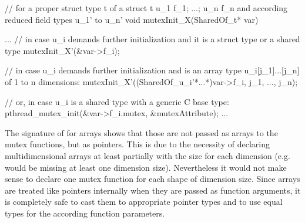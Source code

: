 \begin{ccode}
// for a proper struct type t of a struct t { u_1 f_1; ...; u_n f_n } and according reduced field types u_1' to u_n'
void mutexInit_X(SharedOf_t* var) {
  ...
  // in case u_i demands further initialization and it is a struct type or a shared type
  mutexInit_X'(&var->f_i);
  
  // in case u_i demands further initialization and is an array type u_i[j_1]...[j_n] of 1 to n dimensions:
  mutexInit_X'((SharedOf_u_i'*...*)var->f_i, j_1, ..., j_n);
  
  // or, in case u_i is a shared type with a generic C base type:
  pthread_mutex_init(&var->f_i.mutex, &mutexAttribute);
  ...
}
\end{ccode}
The signature of  for arrays shows that those are not passed as arrays to the mutex functions, but as pointers. This is due to the necessity of declaring multidimensional arrays at least partially with the size for each dimension (e.g.  would be missing at least one dimension size). Nevertheless it would not make sense to declare one mutex function for each shape of dimension size. Since arrays are treated like pointers internally when they are passed as function arguments, it is completely safe to cast them to appropriate pointer types and to use equal types for the according function parameters.


